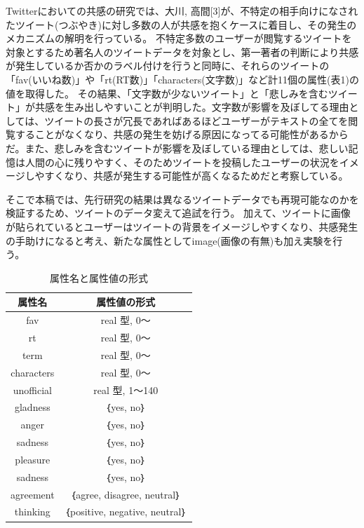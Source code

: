 \documentclass[dvipdfmx]{issj}
\begin{document}
Twitterにおいての共感の研究では、大川, 高間[3]が、不特定の相手向けになされたツイート(つぶやき)に対し多数の人が共感を抱くケースに着目し、その発生のメカニズムの解明を行っている。
不特定多数のユーザーが閲覧するツイートを対象とするため著名人のツイートデータを対象とし、第一著者の判断により共感が発生しているか否かのラベル付けを行うと同時に、それらのツイートの「fav(いいね数)」や「rt(RT数)」「characters(文字数)」など計11個の属性(表1)の値を取得した。
その結果、「文字数が少ないツイート」と「悲しみを含むツイート」が共感を生み出しやすいことが判明した。文字数が影響を及ぼしてる理由としては、ツイートの長さが冗長であればあるほどユーザーがテキストの全てを閲覧することがなくなり、共感の発生を妨げる原因になってる可能性があるからだ。また、悲しみを含むツイートが影響を及ぼしている理由としては、悲しい記憶は人間の心に残りやすく、そのためツイートを投稿したユーザーの状況をイメージしやすくなり、共感が発生する可能性が高くなるためだと考察している。

そこで本稿では、先行研究の結果は異なるツイートデータでも再現可能なのかを検証するため、ツイートのデータ変えて追試を行う。
加えて、ツイートに画像が貼られているとユーザーはツイートの背景をイメージしやすくなり、共感発生の手助けになると考え、新たな属性としてimage(画像の有無)も加え実験を行う。



\begin{table}[h]\centering
\caption{属性名と属性値の形式}\label{tbl:font}
\begin{small}
\begin{tabular}{|c|c|} \hline
属性名            & 属性値の形式\\\hline\hline
fav & real 型, 0～\\\hline
rt  &  real 型, 0～\\\hline
term  & real 型, 0～\\\hline
characters         & real 型, 0～\\\hline
unofficial      &  real 型, 1～140\\\hline
gladness & ｛yes, no｝\\\hline
anger & ｛yes, no｝\\\hline
sadness & ｛yes, no｝\\\hline
pleasure & ｛yes, no｝\\\hline
sadness & ｛yes, no｝\\\hline
agreement & ｛agree, disagree, neutral｝\\\hline
thinking & ｛positive, negative, neutral｝\\\hline
\end{tabular}
\end{small}
\end{table}
\end{document}

